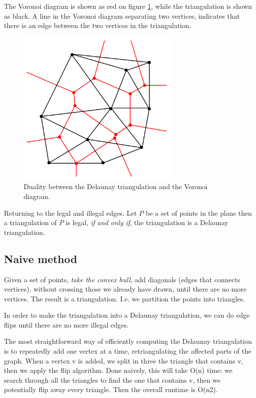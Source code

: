 \documentclass[10pt]{article}
\begin{document}
The Voronoi diagram is shown as red on figure \ref{fig8}, while the triangulation is shown as black. A line in the Voronoi diagram separating two vertices, indicates that there is an edge between the two vertices in the triangulation.

\begin{figure}[ht]
\centering
\includegraphics[width=0.7\textwidth]{figures/fig8.png}
\caption{Duality between the Delaunay triangulation and the Voronoi diagram.}
\label{fig8}
\end{figure}

Returning to the legal and illegal edges. Let $P$ be a set of points in the plane then a triangulation of $P$ is legal, \emph{if and only if}, the triangulation is a Delaunay triangulation.


\subsection{Naive method} %
\label{sub:naive_method}
Given a set of points, \emph{take the convex hull}, add diagonals (edges that connects vertices), without crossing those we already have drawn, until there are no more vertices. The result is a triangulation. I.e. we partition the points into triangles.

In order to make the triangulation into a Delaunay triangulation, we can do edge flips until there are no more illegal edges.


The most straightforward way of efficiently computing the Delaunay triangulation is to repeatedly add one vertex at a time, retriangulating the affected parts of the graph. When a vertex v is added, we split in three the triangle that contains v, then we apply the flip algorithm. Done naively, this will take O(n) time: we search through all the triangles to find the one that contains v, then we potentially flip away every triangle. Then the overall runtime is O(n2).
\end{document}
